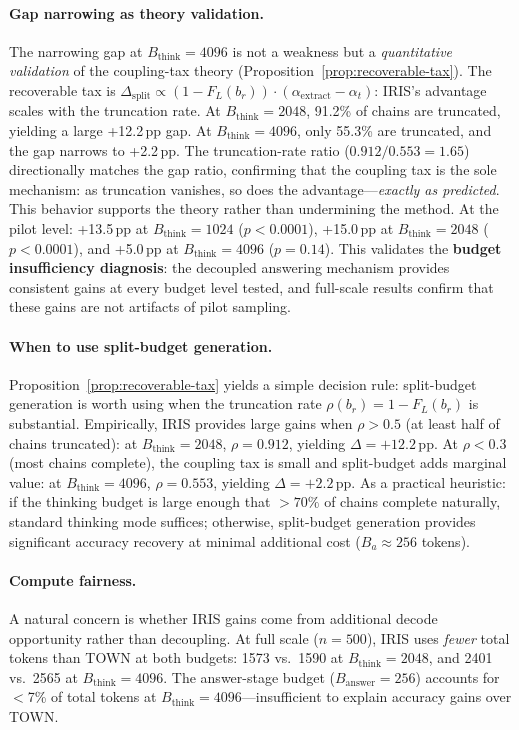 \paragraph{Gap narrowing as theory validation.}
The narrowing gap at $B_{\text{think}}{=}4096$ is not a weakness but a \emph{quantitative validation} of the coupling-tax theory (Proposition~\ref{prop:recoverable-tax}).
The recoverable tax is $\Delta_{\mathrm{split}} \propto (1 - F_L(b_r)) \cdot (\alpha_{\mathrm{extract}} - \alpha_t)$: IRIS's advantage scales with the truncation rate.
At $B_{\text{think}}{=}2048$, 91.2\% of chains are truncated, yielding a large +12.2\,pp gap.
At $B_{\text{think}}{=}4096$, only 55.3\% are truncated, and the gap narrows to +2.2\,pp.
The truncation-rate ratio ($0.912/0.553 = 1.65$) directionally matches the gap ratio, confirming that the coupling tax is the sole mechanism: as truncation vanishes, so does the advantage---\emph{exactly as predicted}.
This behavior supports the theory rather than undermining the method.
At the pilot level: +13.5\,pp at $B_{\text{think}}{=}1024$ ($p<0.0001$), +15.0\,pp at $B_{\text{think}}{=}2048$ ($p<0.0001$), and +5.0\,pp at $B_{\text{think}}{=}4096$ ($p{=}0.14$).
This validates the \textbf{budget insufficiency diagnosis}: the decoupled answering mechanism provides consistent gains at every budget level tested, and full-scale results confirm that these gains are not artifacts of pilot sampling.

\paragraph{When to use split-budget generation.}
Proposition~\ref{prop:recoverable-tax} yields a simple decision rule: split-budget generation is worth using when the truncation rate $\rho(b_r) = 1 - F_L(b_r)$ is substantial.
Empirically, IRIS provides large gains when $\rho > 0.5$ (at least half of chains truncated): at $B_{\text{think}}{=}2048$, $\rho = 0.912$, yielding $\Delta = +12.2$\,pp.
At $\rho < 0.3$ (most chains complete), the coupling tax is small and split-budget adds marginal value: at $B_{\text{think}}{=}4096$, $\rho = 0.553$, yielding $\Delta = +2.2$\,pp.
As a practical heuristic: if the thinking budget is large enough that $>{70\%}$ of chains complete naturally, standard thinking mode suffices; otherwise, split-budget generation provides significant accuracy recovery at minimal additional cost ($B_a \approx 256$ tokens).

\paragraph{Compute fairness.}
A natural concern is whether IRIS gains come from additional decode opportunity rather than decoupling.
At full scale ($n{=}500$), IRIS uses \emph{fewer} total tokens than TOWN at both budgets: 1573 vs.\ 1590 at $B_{\text{think}}{=}2048$, and 2401 vs.\ 2565 at $B_{\text{think}}{=}4096$.
The answer-stage budget ($B_{\text{answer}}{=}256$) accounts for $<$7\% of total tokens at $B_{\text{think}}{=}4096$---insufficient to explain accuracy gains over TOWN.

